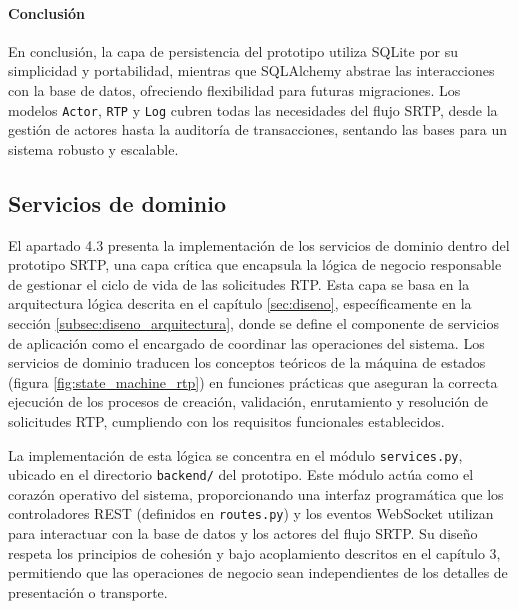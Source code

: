 \paragraph*{Conclusión}

En conclusión, la capa de persistencia del prototipo utiliza SQLite por su simplicidad y portabilidad, mientras que SQLAlchemy abstrae las interacciones con la base de datos, ofreciendo flexibilidad para futuras migraciones. Los modelos \texttt{Actor}, \texttt{RTP} y \texttt{Log} cubren todas las necesidades del flujo SRTP, desde la gestión de actores hasta la auditoría de transacciones, sentando las bases para un sistema robusto y escalable.


\subsection{Servicios de dominio}
\label{subsec:servicios_dominio}

El apartado 4.3 presenta la implementación de los servicios de dominio dentro del prototipo SRTP, una capa crítica que encapsula la lógica de negocio responsable de gestionar el ciclo de vida de las solicitudes RTP. Esta capa se basa en la arquitectura lógica descrita en el capítulo \ref{sec:diseno}, específicamente en la sección \ref{subsec:diseno_arquitectura}, donde se define el componente de servicios de aplicación como el encargado de coordinar las operaciones del sistema. Los servicios de dominio traducen los conceptos teóricos de la máquina de estados (figura \ref{fig:state_machine_rtp}) en funciones prácticas que aseguran la correcta ejecución de los procesos de creación, validación, enrutamiento y resolución de solicitudes RTP, cumpliendo con los requisitos funcionales establecidos.

La implementación de esta lógica se concentra en el módulo \texttt{services.py}, ubicado en el directorio \texttt{backend/} del prototipo. Este módulo actúa como el corazón operativo del sistema, proporcionando una interfaz programática que los controladores REST (definidos en \texttt{routes.py}) y los eventos WebSocket utilizan para interactuar con la base de datos y los actores del flujo SRTP. Su diseño respeta los principios de cohesión y bajo acoplamiento descritos en el capítulo 3, permitiendo que las operaciones de negocio sean independientes de los detalles de presentación o transporte.

